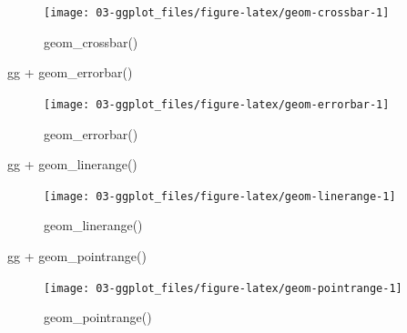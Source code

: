 \documentclass[
  oneside]{book}
\newenvironment{Shaded}{\begin{snugshade}}{\end{snugshade}}
\newcommand{\FunctionTok}[1]{\textcolor[rgb]{0.00,0.00,0.00}{#1}}
\newcommand{\NormalTok}[1]{#1}
\newcommand{\SpecialCharTok}[1]{\textcolor[rgb]{0.00,0.00,0.00}{#1}}
\begin{document}
\begin{figure}

{\centering \texttt{[image: 03-ggplot\_files/figure-latex/geom-crossbar-1]} 

}

\caption{geom_crossbar()}\label{fig:geom-crossbar}
\end{figure}

\begin{Shaded}
\begin{Highlighting}[]
\NormalTok{gg }\SpecialCharTok{+} \FunctionTok{geom\_errorbar}\NormalTok{()}
\end{Highlighting}
\end{Shaded}

\begin{figure}

{\centering \texttt{[image: 03-ggplot\_files/figure-latex/geom-errorbar-1]} 

}

\caption{geom_errorbar()}\label{fig:geom-errorbar}
\end{figure}

\begin{Shaded}
\begin{Highlighting}[]
\NormalTok{gg }\SpecialCharTok{+} \FunctionTok{geom\_linerange}\NormalTok{()}
\end{Highlighting}
\end{Shaded}

\begin{figure}

{\centering \texttt{[image: 03-ggplot\_files/figure-latex/geom-linerange-1]} 

}

\caption{geom_linerange()}\label{fig:geom-linerange}
\end{figure}

\begin{Shaded}
\begin{Highlighting}[]
\NormalTok{gg }\SpecialCharTok{+} \FunctionTok{geom\_pointrange}\NormalTok{()}
\end{Highlighting}
\end{Shaded}

\begin{figure}

{\centering \texttt{[image: 03-ggplot\_files/figure-latex/geom-pointrange-1]} 

}

\caption{geom_pointrange()}\label{fig:geom-pointrange}
\end{figure}
\end{document}
